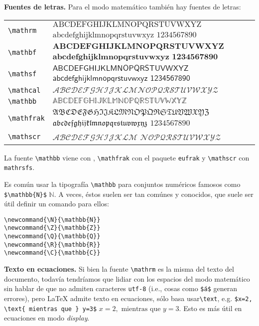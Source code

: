 \documentclass[intro-breve-latex.tex]{subfiles}
\begin{document}
\textbf{Fuentes de letras.} Para el modo matemático también hay fuentes de letras:
\begin{center}
	\begin{longtable}{lp{8cm}}
		\hline \hline
		\endhead
		\hline \hline
		\endfoot

		\lstinline|\mathrm|   & $\mathrm{ABCDEFGHIJKLMNOPQRSTUVWXYZ}$ $\mathrm{abcdefghijklmnopqrstuvwxyz}$ $\mathrm{1234567890}$ \\
		\lstinline|\mathbf|   & $\mathbf{ABCDEFGHIJKLMNOPQRSTUVWXYZ}$ $\mathbf{abcdefghijklmnopqrstuvwxyz}$ $\mathbf{1234567890}$ \\
		\lstinline|\mathsf|   & $\mathsf{ABCDEFGHIJKLMNOPQRSTUVWXYZ}$ $\mathsf{abcdefghijklmnopqrstuvwxyz}$ $\mathsf{1234567890}$ \\
		\lstinline|\mathcal|  & $\mathcal{ABCDEFGHIJKLMNOPQRSTUVWXYZ}$ \\
		\lstinline|\mathbb|   & $\mathbb{ABCDEFGHIJKLMNOPQRSTUVWXYZ}$ \\
		\lstinline|\mathfrak| & $\mathfrak{ABCDEFGHIJKLMNOPQRSTUVWXYZ}$ $\mathfrak{abcdefghijklmnopqrstuvwxyz}$ $\mathfrak{1234567890}$ \\
		\lstinline|\mathscr|  & $\mathscr{ABCDEFGHIJKLM}$ $\mathscr{NOPQRSTUVWXYZ}$ \\
	\end{longtable}
\end{center}
La fuente \lstinline|\mathbb| viene con \AmS{}, \lstinline|\mathfrak| con el paquete \texttt{eufrak} y\break
\lstinline|\mathscr| con \texttt{mathrsfs}.

Es común usar la tipografía \lstinline|\mathbb| para conjuntos numéricos famosos como \lstinline|$\mathbb{N}$| $\mathbb{N}$. A veces,
éstos suelen ser tan comúnes y conocidos, que suele ser útil definir un comando para ellos:
\begin{lstlisting}
\newcommand{\N}{\mathbb{N}}
\newcommand{\Z}{\mathbb{Z}}
\newcommand{\Q}{\mathbb{Q}}
\newcommand{\R}{\mathbb{R}}
\newcommand{\C}{\mathbb{C}}
\end{lstlisting}
\textbf{Texto en ecuaciones.}
Si bien la fuente \lstinline|\mathrm| es la misma del texto del documento, todavía tendríamos que lidiar con los
espacios del modo matemático sin hablar de que no admiten caracteres \texttt{utf-8} (i.e., cosas como \lstinline|$á$|
generan errores), pero \LaTeX{} admite texto en ecuaciones, sólo basa usar\break \lstinline|\text|, e.g.
\lstinline|$x=2, \text{ mientras que } y=3$| $x=2,\text{ mientras que }y=3$.
Esto es más útil en ecuaciones en modo \textit{display}.
\end{document}
